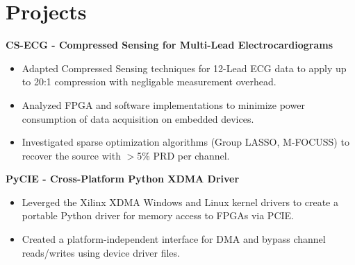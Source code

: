 \section{Projects}

\textbf{CS-ECG - Compressed Sensing for Multi-Lead Electrocardiograms} \\

\begin{itemize}
    \item Adapted Compressed Sensing techniques for 12-Lead ECG data to apply up to 20:1 compression with negligable measurement overhead.
    \item Analyzed FPGA and software implementations to minimize power consumption of data acquisition on embedded devices.
    \item Investigated sparse optimization algorithms {\small (Group LASSO, M-FOCUSS)} to recover the source with {\small\(>\)}5\% PRD per channel.
\end{itemize}

\textbf{PyCIE - Cross-Platform Python XDMA Driver} \\

\begin{itemize}
    \item Leverged the Xilinx XDMA Windows and Linux kernel drivers to create a portable Python driver for memory access to FPGAs via PCIE.
    \item Created a platform-independent interface for DMA and bypass channel reads/writes using device driver files.
\end{itemize}
